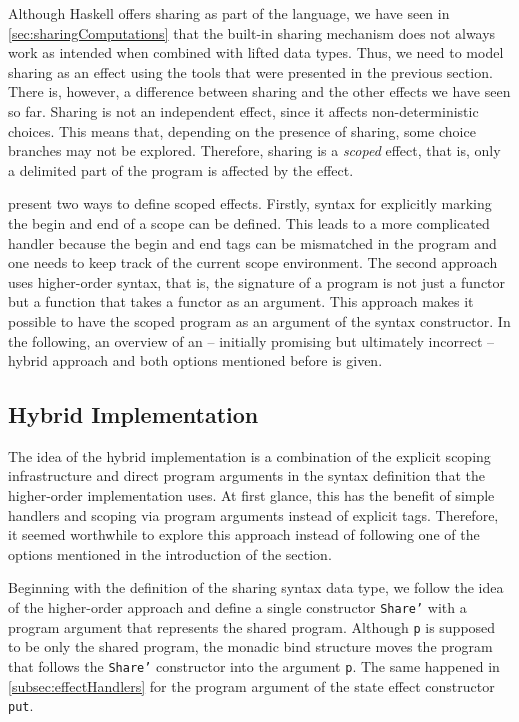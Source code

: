 \documentclass[a4paper, 11pt, fleqn, twoside, abstract=on]{scrreprt}
\newcommand{\hinl}[1]{\texttt{#1}}
\begin{document}
Although Haskell offers sharing as part of the language, we have seen in \autoref{sec:sharingComputations} that the built-in sharing mechanism does not always work as intended when combined with lifted data types.
Thus, we need to model sharing as an effect using the tools that were presented in the previous section.
There is, however, a difference between sharing and the other effects we have seen so far.
Sharing is not an independent effect, since it affects non-deterministic choices.
This means that, depending on the presence of sharing, some choice branches may not be explored.
Therefore, sharing is a \textit{scoped} effect, that is, only a delimited part of the program is affected by the effect.

\citet{wu2014effect} present two ways to define scoped effects.
Firstly, syntax for explicitly marking the begin and end of a scope can be defined.
This leads to a more complicated handler because the begin and end tags can be mismatched in the program and one needs to keep track of the current scope environment.
The second approach uses higher-order syntax, that is, the signature of a program is not just a functor but a function that takes a functor as an argument.
This approach makes it possible to have the scoped program as an argument of the syntax constructor.
In the following, an overview of an  -- initially promising but ultimately incorrect  -- hybrid approach and both options mentioned before is given.

\subsection{Hybrid Implementation}

The idea of the hybrid implementation is a combination of the explicit scoping infrastructure and direct program arguments in the syntax definition that the higher-order implementation uses.
At first glance, this has the benefit of simple handlers and scoping via program arguments instead of explicit tags.
Therefore, it seemed worthwhile to explore this approach instead of following one of the options mentioned in the introduction of the section.

Beginning with the definition of the sharing syntax data type, we follow the idea of the higher-order approach and define a single constructor \hinl{Share'} with a program argument that represents the shared program.
Although \hinl{p} is supposed to be only the shared program, the monadic bind structure moves the program that follows the \hinl{Share'} constructor into the argument \hinl{p}.
The same happened in \autoref{subsec:effectHandlers} for the program argument of the state effect constructor \hinl{put}.
\end{document}
